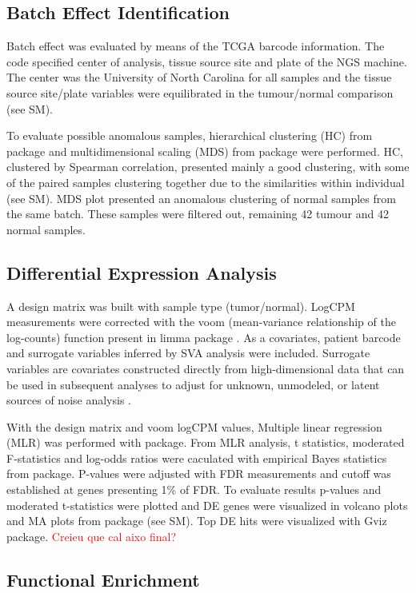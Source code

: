 \documentclass[9pt,twocolumn,twoside]{gsajnl}
\begin{document}
\subsection*{Batch Effect Identification}
Batch effect was evaluated by means of the TCGA barcode information. The code specified center of analysis, tissue source site and plate of the NGS machine. The center was the University of North Carolina for all samples and the tissue source site/plate variables were equilibrated in the tumour/normal comparison (see SM).

To evaluate possible anomalous samples, hierarchical clustering (HC) from \cite{pheatmap} package and multidimensional scaling (MDS) from \cite{limma} package were performed. HC, clustered by Spearman correlation, presented mainly a good clustering, with some of the paired samples clustering together due to the similarities within individual (see SM). MDS plot presented an anomalous clustering of normal samples from the same batch. These samples were filtered out, remaining 42 tumour and 42 normal samples.

\subsection*{Differential Expression Analysis}

A design matrix was built with sample type (tumor/normal). LogCPM measurements were corrected with the  voom (mean-variance relationship of the log-counts) function present in limma package \cite{voom}. As a covariates,  patient barcode and surrogate variables inferred by SVA analysis were included. Surrogate variables are covariates constructed directly from high-dimensional data that can be used in subsequent analyses to adjust for unknown, unmodeled, or latent sources of noise analysis \cite{GSVA}.

With the design matrix and voom logCPM values, Multiple linear regression (MLR) was performed with \cite{limma} package. From MLR analysis, t statistics, moderated F-statistics and  log-odds ratios were caculated with empirical Bayes statistics from \cite{limma} package. P-values were adjusted with FDR measurements and cutoff was established at genes presenting 1\% of FDR. To evaluate results p-values and moderated t-statistics were plotted and DE genes were visualized in volcano plots and  MA plots  from \cite{limma} package (see SM). Top DE hits were visualized with Gviz package. \textcolor{red}{Creieu que cal aixo final?}


\subsection*{Functional Enrichment}
\end{document}
